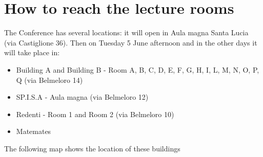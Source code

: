 \section*{How to reach the lecture rooms}
The Conference has several locations: it will open in Aula magna Santa Lucia (via Castiglione 36).
Then on Tuesday 5 June afternoon and in the other days it will take place in:
\begin{itemize}
\item Building A and Building B - Room A, B, C, D, E, F, G, H, I, L, M, N, O, P, Q (via Belmeloro 14)
\item SP.I.S.A - Aula magna (via Belmeloro 12)
\item Redenti - Room 1 and Room 2 (via Belmeloro 10)
\item Matemates
\end{itemize}
The following map shows the location of these buildings


